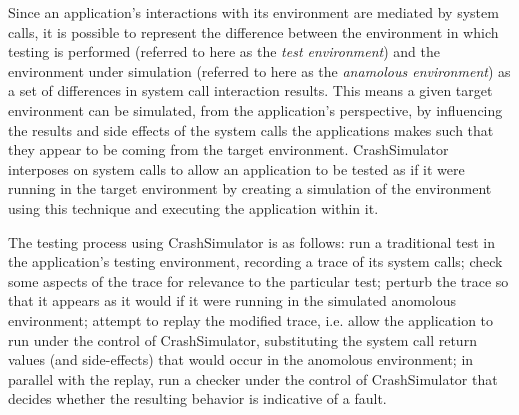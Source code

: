 Since an application's interactions with its environment are mediated by system calls,
it is possible to represent the difference between the environment in which testing is performed (referred to here
as the {\em test environment}) and the environment under simulation (referred to here as the {\em anamolous environment})
as a set of differences in system call interaction results. 
This means
a given target environment can be simulated, from the application's perspective, by influencing the results and side
effects of the system calls the applications makes such that they appear to be coming from the target environment.
CrashSimulator interposes on system calls to allow an application to
be tested as if it were running in the target environment by creating a simulation of
the environment using this technique and executing the application within it.

The testing process using CrashSimulator is as follows:
	run a traditional test in the application's testing environment, recording a trace of its system calls;
	check some aspects of the trace for relevance to the particular test;
		perturb the trace so that it appears as it would if it were running in the simulated anomolous environment;
		attempt to replay the modified trace, i.e. allow the application to run under the control of CrashSimulator, substituting the system call return values (and side-effects) that would occur in the anomolous environment;
		in parallel with the replay, run a checker under the control of CrashSimulator that decides whether the resulting behavior is indicative of a fault.

